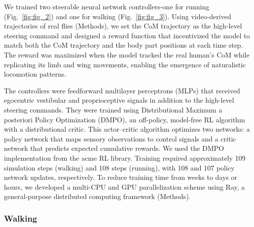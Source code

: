 \documentclass[sn-mathphys-num]{sn-jnl}%
\theoremstyle{thmstyleone}	%
\theoremstyle{thmstyletwo}	%
\theoremstyle{thmstylethree}	%
\begin{document}
We trained two steerable neural network controllers-one for running (Fig.~\ref{fig:fig_2}) and one for walking (Fig.~\ref{fig:fig_3}). 
Using video-derived trajectories of real flies (Methods), we set the CoM trajectory as the high-level steering command and designed a reward function that incentivized the model to match both the CoM trajectory and the body part positions at each time step. 
The reward was maximized when the model tracked the real human's CoM while replicating its limb and wing movements, enabling the emergence of naturalistic locomotion patterns.


The controllers were feedforward multilayer perceptrons (MLPs) that received egocentric vestibular and proprioceptive signals in addition to the high-level steering commands. 
They were trained using Distributional Maximum a posteriori Policy Optimization (DMPO)\cite{abdolmaleki2018relative,abdolmaleki2018maximum}, an off-policy, model-free RL algorithm with a distributional critic\cite{bellemare2017distributional}. 
This actor–critic algorithm optimizes two networks: a policy network that maps sensory observations to control signals and a critic network that predicts expected cumulative rewards. 
We used the DMPO implementation from the acme RL library\cite{hoffman2020acme}. 
Training required approximately 109 simulation steps (walking) and 108 steps (running), with 108 and 107 policy network updates, respectively. 
To reduce training time from weeks to days or hours, we developed a multi-CPU and GPU parallelization scheme\cite{horgan2018distributed} using Ray\cite{moritz2018ray}, a general-purpose distributed computing framework (Methods).


\subsubsection{Walking}
\end{document}
